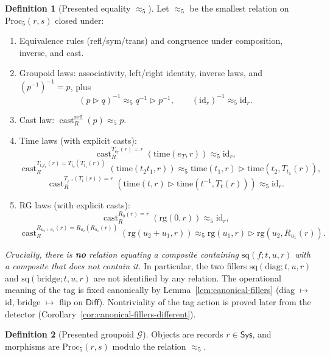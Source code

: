 \documentclass[aps,prl,reprint]{revtex4-2}
\newcommand{\Sys}{\mathsf{Sys}}
\newcommand{\Diff}{\mathsf{Diff}}
\newcommand{\castR}[2]{\operatorname{cast}_R^{#1}\!\left(#2\right)}
\theoremstyle{definition}
\newtheorem{definition}{Definition}[section]
\theoremstyle{plain}
\begin{document}
\begin{definition}[Presented equality $\approx_5$]
\label{def:limited-scope-theorem-translation-clean-001}
Let $\approx_5$ be the smallest relation on $\mathrm{Proc}_5(r,s)$ closed under:
\begin{enumerate}[label=\textbf{(R\arabic*)},leftmargin=*,itemsep=0.4em]
\item Equivalence rules (refl/sym/trans) and congruence under
composition, inverse, and cast.
\item Groupoid laws: associativity, left/right identity, inverse laws, and
$(p^{-1})^{-1}=p$, plus
\[
(p\triangleright q)^{-1}\approx_5 q^{-1}\triangleright p^{-1},\qquad
(\mathrm{id}_r)^{-1}\approx_5 \mathrm{id}_r.
\]
\item Cast law: $\castR{\mathrm{refl}}{p}\approx_5 p$.
\item Time laws (with explicit casts):
\[
\castR{T_{e_T}(r)=r}{\mathrm{time}(e_T,r)}\approx_5 \mathrm{id}_r,
\]
\[
\castR{T_{t_2t_1}(r)=T_{t_2}(T_{t_1}(r))}{\mathrm{time}(t_2t_1,r)}
\approx_5 \mathrm{time}(t_1,r)\triangleright \mathrm{time}(t_2,T_{t_1}(r)),
\]
\[
\castR{T_{t^{-1}}(T_t(r))=r}{
  \mathrm{time}(t,r)\triangleright \mathrm{time}(t^{-1},T_t(r))
}\approx_5 \mathrm{id}_r.
\]
\item RG laws (with explicit casts):
\[
\castR{R_0(r)=r}{\mathrm{rg}(0,r)}\approx_5 \mathrm{id}_r,
\]
\[
\castR{R_{u_2+u_1}(r)=R_{u_2}(R_{u_1}(r))}{\mathrm{rg}(u_2+u_1,r)}
\approx_5 \mathrm{rg}(u_1,r)\triangleright \mathrm{rg}(u_2,R_{u_1}(r)).
\]
\end{enumerate}
\emph{Crucially, there is \textbf{no} relation equating a composite containing
$\mathrm{sq}(f;t,u,r)$ with a composite that does not contain it.}
In particular, the two fillers $\mathrm{sq}(\mathrm{diag};t,u,r)$ and
$\mathrm{sq}(\mathrm{bridge};t,u,r)$ are not identified by any relation.
The operational meaning of the tag is fixed canonically by
Lemma~\ref{lem:canonical-fillers} (diag $\mapsto$ id, bridge $\mapsto$ flip on $\Diff$).
Nontriviality of the tag action is proved later from the detector
(Corollary~\ref{cor:canonical-fillers-different}).

\end{definition}

\begin{definition}[Presented groupoid $\mathcal G$]
\label{def:limited-scope-theorem-translation-clean-002}
Objects are records $r\in\Sys$, and morphisms are $\mathrm{Proc}_5(r,s)$ modulo
the relation $\approx_5$.
\end{definition}
\end{document}
